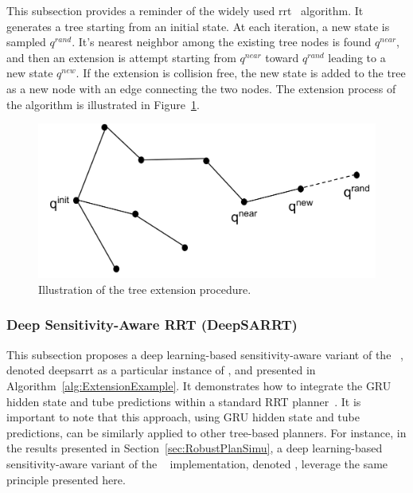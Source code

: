This subsection provides a reminder of the widely used \gls{rrt}~\cite{cRRT} algorithm.
It generates a tree starting from an initial state.
At each iteration, a new state is sampled $q^{rand}$.
It's nearest neighbor among the existing tree nodes is found $q^{near}$, and then an extension is attempt starting from $q^{near}$ toward $q^{rand}$ leading to a new state $q^{new}$.
If the extension is collision free, the new state is added to the tree as a new node with an edge connecting the two nodes.
The extension process of the algorithm is illustrated in Figure~\ref{fig:rrt}.

\begin{figure} [htp]
    \centering
    \includegraphics[width=0.6\linewidth]{figures/models/rrt.png} 
    \caption{Illustration of the  tree extension procedure.}%
    \label{fig:rrt}%
\end{figure}

\subsubsection{Deep Sensitivity-Aware RRT (DeepSARRT)}

This subsection proposes a deep learning-based sensitivity-aware variant of the ~\cite{cRRT}, denoted \gls{deepsarrt} as a particular instance of , and presented in Algorithm~\ref{alg:ExtensionExample}. 
It demonstrates how to integrate the GRU hidden state and tube predictions within a standard RRT planner~\cite{cRRT}.
It is important to note that this approach, using GRU hidden state and tube predictions, can be similarly applied to other tree-based planners. 
For instance, in the results presented in Section~\ref{sec:RobustPlanSimu}, a deep learning-based sensitivity-aware variant of the ~\cite{cRRTstar} implementation, denoted , leverage the same principle presented here.

